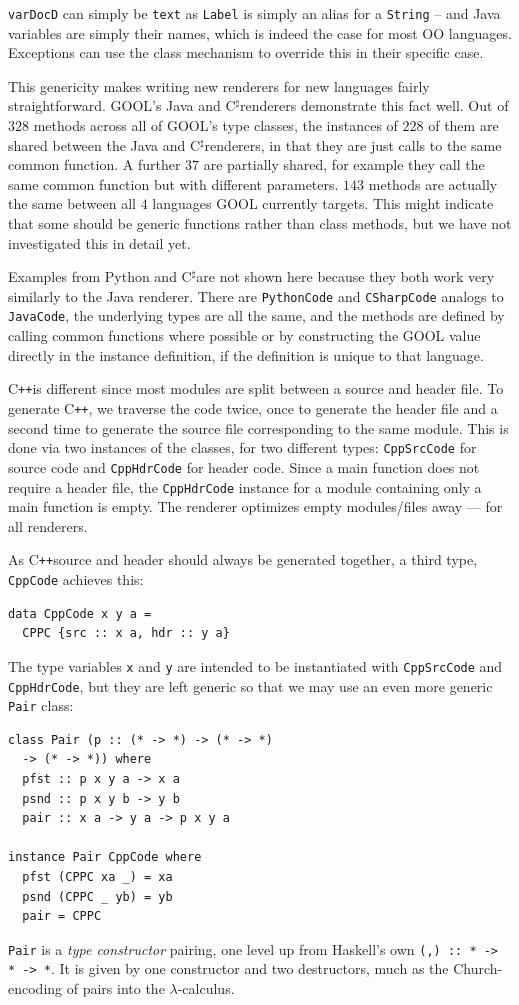 \documentclass[sigplan,review,anonymous,prologue,dvipsnames]{acmart}
\newcommand{\Csharp}{C$^{\sharp}$}
\newcommand{\Cplusplus}{C\texttt{++}}
\begin{document}
\verb|varDocD| can simply be \verb|text| as \verb|Label| is simply an
alias for a \verb|String| -- and Java variables are simply their names,
which is indeed the case for most OO languages.  Exceptions can use the
class mechanism to override this in their specific case.

This genericity
makes writing new renderers for new languages fairly straightforward.
GOOL's Java and \Csharp renderers demonstrate this fact well. Out of $328$
methods across all of GOOL's type classes, the instances of $228$ of them are
shared between the Java and \Csharp renderers, in that they are just calls to the
same common function. A further $37$ are partially shared, for example they call
the same common function but with different parameters. $143$ methods are
actually the same between all $4$ languages GOOL currently targets. This might
indicate that some should be generic functions rather than class methods,
but we have not investigated this in detail yet.

Examples from Python and \Csharp are not shown here because they both
work very similarly to the Java renderer. There are \verb|PythonCode| and
\verb|CSharpCode| analogs to \verb|JavaCode|, the underlying types are all the
same, and the methods are defined by calling common functions where possible
or by constructing the GOOL value directly in the instance definition, if the
definition is unique to that language.

\Cplusplus is different since most modules are split between a source and
header file. To generate \Cplusplus, we traverse the code twice,
once to generate the header file and a second time to generate the
source file corresponding to the same module. This is done via two instances
of the classes, for two different types: \verb|CppSrcCode| for source code and
\verb|CppHdrCode| for header code. Since a main function does not require a
header file, the \verb|CppHdrCode| instance for a module containing only a main
function is empty. The renderer optimizes empty modules/files away --- for
all renderers.

As \Cplusplus source and header should always be generated together, a third
type, \verb|CppCode| achieves this:
\begin{lstlisting}
data CppCode x y a =
  CPPC {src :: x a, hdr :: y a}
\end{lstlisting}
The type variables \verb|x| and \verb|y| are intended to be instantiated with
\verb|CppSrcCode| and \verb|CppHdrCode|, but they are left generic
so that we may use an even more generic \verb|Pair| class:
\begin{lstlisting}
class Pair (p :: (* -> *) -> (* -> *)
  -> (* -> *)) where
  pfst :: p x y a -> x a
  psnd :: p x y b -> y b
  pair :: x a -> y a -> p x y a

instance Pair CppCode where
  pfst (CPPC xa _) = xa
  psnd (CPPC _ yb) = yb
  pair = CPPC
\end{lstlisting}
\verb|Pair| is a \emph{type constructor} pairing, one level up from
Haskell's own \verb|(,) :: * -> * -> *|.  It is given by one constructor
and two destructors, much as the Church-encoding of pairs into the
$\lambda$-calculus.
\end{document}
